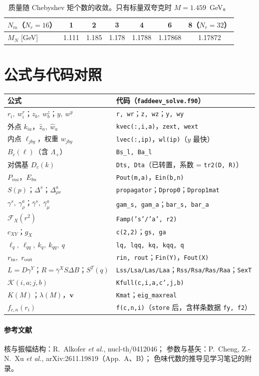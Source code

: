 \documentclass[11pt,a4paper]{ctexart}
\newcommand{\lQ}{\ell_q}
\newcommand{\lQQ}{\ell_{qq}}
\newcommand{\kQ}{k_q}
\newcommand{\kQQ}{k_{qq}}
\newcommand{\code}[1]{\texttt{#1}}
\begin{document}
\begin{table}[H]
\centering\small
\begin{tabular}{lcccccc}
\toprule
$N_m$（$N_r=16$） & 1 & 2 & 3 & 4 & 6 & 8（$N_r=32$）\\
\midrule
$M_N$ [GeV] & 1.111 & 1.185 & 1.178 & 1.1788 & 1.17868 & 1.17872\\
\bottomrule
\end{tabular}
\caption{质量随 Chebyshev 矩个数的收敛。只有标量双夸克时 $M=1.459$~GeV。}
\end{table}

\section{公式与代码对照}

\begin{table}[H]
\centering\small
\begin{tabular}{>{\raggedright}p{}>{\raggedright\arraybackslash}p{}}
\toprule
公式 & 代码（\code{faddeev\_solve.f90}）\\
\midrule
$r_i,\ w^r_i$；$z_b,\ w^z_b$；$y,\ w^y$ & \code{r, wr}；\code{z, wz}；\code{y, wy}\\
外点 $k_{ia}$，$\hat z_a,\ \hat w_a$ & \code{kvec(:,i,a)}，\code{zext, wext}\\
内点 $\ell_{jby}$，权重 $w_{jby}$ & \code{lvec(:,ip)}，\code{wl(ip)}（$y$ 最快）\\
$B_c(\ell)$（含 $\Lambda_+$） & \code{Bs\_l, Ba\_l}\\
对偶基 $D_c(k)$ & \code{Dts, Dta}（已转置，系数 = \code{tr2(D, R)}）\\
$P_{ma}$，$E_{bn}$ & \code{Pout(m,a)}，\code{Ein(b,n)}\\
$S(p)$；$\Delta^s$；$\Delta^a_{\rho\nu}$ & \code{propagator}；\code{Dprop0}；\code{Dprop1mat}\\
$\gamma^s,\ \gamma^a_\rho$；$\bar\gamma^s,\ \bar\gamma^a_\mu$ & \code{gam\_s, gam\_a}；\code{bar\_s, bar\_a}\\
$\mathcal F_X(r^2)$ & \code{Famp('s'/'a', r2)}\\
$c_{XY}$；$g_X$ & \code{c(2,2)}；\code{gs, ga}\\
$\lQ,\ \lQQ,\ \kQ,\ \kQQ,\ q$ & \code{lq, lqq, kq, kqq, q}\\
$r_{\rm in},\ r_{\rm out}$ & \code{rin, rout}；\code{Fin(Y)}，\code{Fout(X)}\\
$L=D\gamma^Y$；$R=\bar\gamma^XS\Delta B$；$S^T(q)$ & \code{Lss/Lsa/Las/Laa}；\code{Rss/Rsa/Ras/Raa}；\code{SexT}\\
$\mathcal K(i,a;j,b)$ & \code{Kfull(c,i,a,c',j,b)}\\
$K(M)$；$\lambda(M)$，$\boldsymbol v$ & \code{Kmat}；\code{eig\_maxreal}\\
$f_{c,n}(r_i)$ & \code{f(c,n,i)}（\code{store} 后，含样条数据 \code{fy, f2}）\\
\bottomrule
\end{tabular}
\end{table}

\paragraph{参考文献} 核与振幅结构：R.~Alkofer \emph{et al.}, nucl-th/0412046；
参数与基矢：P.~Cheng, Z.-N.~Xu \emph{et al.}, arXiv:2611.19819（App.~A、B）；
色味代数的推导见学习笔记的附录。
\end{document}
